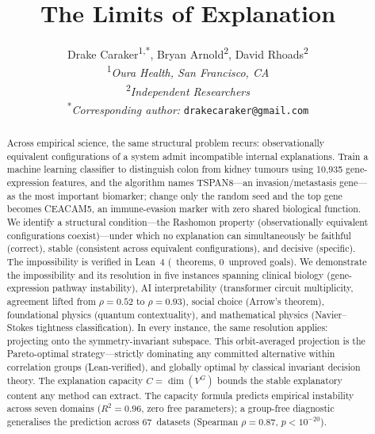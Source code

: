 \documentclass[11pt]{article}
\title{\Large\textbf{The Limits of Explanation}}
\author{%
  Drake Caraker\textsuperscript{1,*},
  Bryan Arnold\textsuperscript{2},
  David Rhoads\textsuperscript{2}
  \\[4pt]
  \textsuperscript{1}\textit{Oura Health, San Francisco, CA}
  \\[2pt]
  \textsuperscript{2}\textit{Independent Researchers}
  \\[2pt]
  \textsuperscript{*}\textit{Corresponding author:} \texttt{drakecaraker@gmail.com}
}
\date{}
\begin{document}
\maketitle


\begin{abstract}
Across empirical science, the same structural problem recurs:
observationally equivalent configurations of a system admit incompatible
internal explanations.  Train a machine learning classifier to
distinguish colon from kidney tumours using 10{,}935 gene-expression
features, and the algorithm names TSPAN8---an invasion/metastasis
gene---as the most important biomarker; change only the random seed and
the top gene becomes CEACAM5, an immune-evasion marker with zero shared
biological function.  We identify a structural condition---the Rashomon
property (observationally equivalent configurations coexist)---under
which no explanation can simultaneously be faithful (correct), stable
(consistent across equivalent configurations), and decisive (specific).
The impossibility is verified in Lean~4 (\ClaimMainTheorems~theorems, 0~unproved
goals).  We demonstrate the impossibility and its resolution in five
instances spanning clinical biology (gene-expression pathway
instability), AI interpretability (transformer circuit multiplicity,
agreement lifted from $\rho = 0.52$ to $\rho = 0.93$), social choice
(Arrow's theorem), foundational physics (quantum contextuality), and
mathematical physics (Navier--Stokes tightness classification).  In
every instance, the same resolution applies: projecting onto the
symmetry-invariant subspace.
This orbit-averaged projection is the Pareto-optimal strategy---strictly
dominating any committed alternative within correlation groups (Lean-verified),
and globally optimal by classical invariant decision theory.
The explanation capacity $C = \dim(V^G)$ bounds the stable explanatory
content any method can extract.  The capacity formula predicts
empirical instability across seven domains ($R^2 = 0.96$, zero free
parameters); a group-free diagnostic generalises the prediction across
67~datasets (Spearman $\rho = 0.87$, $p < 10^{-20}$).
\end{abstract}

\end{document}
